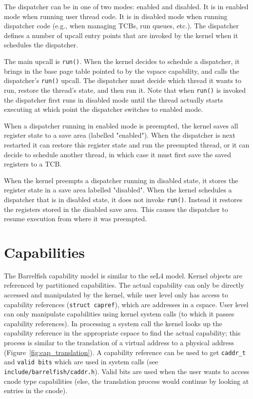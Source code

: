 \documentclass[a4paper,twoside]{report} %
\begin{document}
The dispatcher can be in one of two modes: enabled and disabled. It is in
enabled mode when running user thread code. It is in disabled mode when running
dispatcher code (e.g., when managing TCBs, run queues, etc.). The dispatcher
defines a number of upcall entry points that are invoked by the kernel when it
schedules the dispatcher.

The main upcall is \texttt{run()}.  When the kernel decides to schedule a
dispatcher, it brings in the base page table pointed to by the vspace
capability, and calls the dispatcher's \texttt{run()} upcall.  The dispatcher
must decide which thread it wants to run, restore the thread's state, and then
run it. Note that when \texttt{run()} is invoked the dispatcher first runs in
disabled mode until the thread actually starts executing at which point the
dispatcher switches to enabled mode.

When a dispatcher running in enabled mode is preempted, the kernel saves all
register state to a save area (labelled "enabled"). When the dispatcher is next
restarted it can restore this register state and run the preempted thread, or it
can decide to schedule another thread, in which case it must first save the
saved registers to a TCB.  

When the kernel preempts a dispatcher running in disabled state, it stores the
register state in a save area labelled "disabled". When the kernel schedules a
dispatcher that is in disabled state, it does not invoke \texttt{run()}. Instead
it restores the registers stored in the disabled save area. This causes the
dispatcher to resume execution from where it was preempted.

\section{Capabilities}

The Barrelfish capability model is similar to the seL4 model. Kernel objects are
referenced by partitioned capabilities. The actual capability can only be
directly accessed and manipulated by the kernel, while user level only has
access to capability references (\texttt{struct capref}), which are addresses in
a cspace. User level can only manipulate capabilities using kernel system calls
(to which it passes capability references). In processing a system call the
kernel looks up the capability reference in the appropriate cspace to find the
actual capability; this process is similar to the translation of a virtual
address to a physical address (Figure~\ref{fig:cap_translation}). A capability
reference can be used to get \texttt{caddr\_t} and \texttt{valid bits} which are
used in system calls (see \texttt{include/barrelfish/caddr.h}).  Valid bits are
used when the user wants to access cnode type capabilities (else, the
translation process would continue by looking at entries in the cnode).
\end{document}
